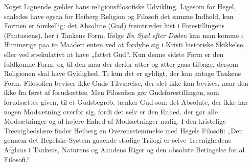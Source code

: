 \documentclass[12pt,a4paper,openany]{book}
\begin{document}
Noget Lignende gælder hans religionsfilosofiske Udvikling. Ligesom for Hegel,
saaledes have ogsaa for Heiberg Religion og Filosofi det samme Indhold, kun
Formen er forskellig: det Absolute (Gud) fremtræder hist i Forestillingens
(Fantasiens), her i Tankens Form. Ifølge \textit{En Sjæl efter Døden} kan man
komme i Himmerige paa to Maader: enten ved at fordybe sig i Kristi historiske
Skikkelse, eller ved spekulativt at have „fattet Gud“. Kun denne sidste Form er
den fuldkomne Form, og til den maa der derfor atter og atter gaas tilbage,
dersom Religionen skal have Gyldighed. Ti kun det er gyldigt, der kan antage
Tankens Form. Filosofien beviser ikke Guds Tilværelse, der slet ikke kan
bevises, naar den ikke fra først af forudsættes. Men Filosofien gør
Gudsforestillingen, som forudsættes given, til et Gudsbegreb, tænker Gud som
det Absolute, der ikke har nogen Modsætning overfor sig, fordi det selv er den
Enhed, der gør alle Modsætninger og al højere Enhed af Modsætninger mulig. I
den kristelige Treenighedslære finder Heiberg en Overensstemmelse med Hegels
Filosofi: „Den gennem det Hegelske System gaaende stadige Trilogi er selve
Treenighedens Afglans i Tankens, Naturens og Aandens Riger og den absolute
Betingelse for al Filosofi.“
\end{document}
